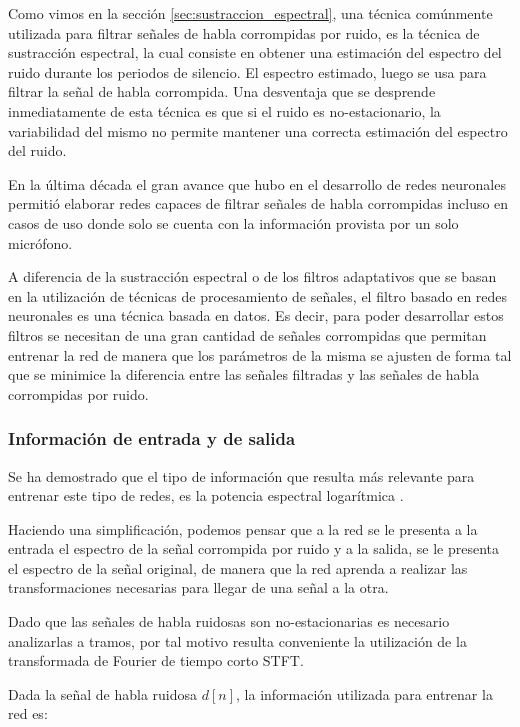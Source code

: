 Como vimos en la sección \ref{sec:sustraccion_espectral}, una técnica comúnmente utilizada para filtrar señales de habla corrompidas por ruido, es la técnica de sustracción espectral, la cual consiste en obtener una estimación del espectro del ruido durante los periodos de silencio. El espectro estimado, luego se usa para filtrar la señal de habla corrompida. Una desventaja que se desprende inmediatamente de esta técnica es que si el ruido es no-estacionario, la variabilidad del mismo no permite mantener una correcta estimación del espectro del ruido.

En la última década el gran avance que hubo en el desarrollo de redes neuronales \cite{deep_learning} permitió elaborar redes capaces de filtrar señales de habla corrompidas incluso en casos de uso donde solo se cuenta con la información provista por un solo micrófono. 

A diferencia de la sustracción espectral o de los filtros adaptativos que se basan en la utilización de técnicas de procesamiento de señales, el filtro basado en redes neuronales es una técnica basada en datos. Es decir, para poder desarrollar estos filtros se necesitan de una gran cantidad de señales corrompidas que permitan entrenar la red de manera que los parámetros de la misma se ajusten de forma tal que se minimice la diferencia entre las señales filtradas y las señales de habla corrompidas por ruido.

\subsubsection{Información de entrada y de salida}

Se ha demostrado que el tipo de información que resulta más relevante para entrenar este tipo de redes, es la potencia espectral logarítmica \cite{a_regression_approach_to_speech_enhancement_based_on_deep_neural_networks}. 

Haciendo una simplificación, podemos pensar que a la red se le presenta a la entrada el espectro de la señal corrompida por ruido y a la salida, se le presenta el espectro de la señal original, de manera que la red aprenda a realizar las transformaciones necesarias para llegar de una señal a la otra.

Dado que las señales de habla ruidosas son no-estacionarias es necesario analizarlas a tramos, por tal motivo resulta conveniente la utilización de la transformada de Fourier de tiempo corto STFT. 

Dada la señal de habla ruidosa $d[n]$, la información utilizada para entrenar la red es:

